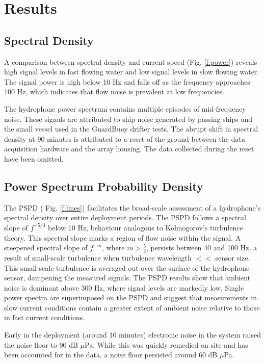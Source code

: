 \documentclass[12pt,journal,onecolumn]{IEEEtran}
\begin{document}
\section{Results}
\label{IV}



\subsection{Spectral Density}

A comparison between spectral density and current speed (Fig. \ref{f:power}) reveals high signal levels in fast flowing water and low signal levels in slow flowing water. The signal power is high below 10 Hz and falls off as the frequency approaches 100 Hz, which indicates that flow noise is prevalent at low frequencies. 

The hydrophone power spectrum contains multiple episodes of mid-frequency noise. These signals are attributed to ship noise generated by passing ships and the small vessel used in the GuardBuoy drifter tests. The abrupt shift in spectral density at 90 minutes is attributed to a reset of the ground between the data acquisition hardware and the array housing. The data collected during the reset have been omitted.
\subsection{Power Spectrum Probability Density}
The PSPD ( Fig. \ref{f:lines}) facilitates the broad-scale assessment of a hydrophone's spectral density over entire deployment periods. The PSPD follows a spectral slope of $f^{-5/3}$ below 10 Hz, behaviour analogous to Kolmogorov's turbulence theory. This spectral slope marks a region of flow noise within the signal. A steepened spectral slope of $f^{-m}$, where $m>\frac{5}{3}$, persists between 40 and 100 Hz, a result of small-scale turbulence when turbulence wavelength $<<$ sensor size. This small-scale turbulence is averaged out over the surface of the hydrophone sensor, dampening the measured signals. The PSPD results show that ambient noise is dominant above 300 Hz, where signal levels are markedly low. Single power spectra are superimposed on the PSPD and suggest that measurements in slow current conditions contain a greater extent of ambient noise relative to those in fast current conditions. 

Early in the deployment (around 10 minutes) electronic noise in the system raised the noise floor to 90 dB $\mu$Pa. While this was quickly remedied on site and has been accounted for in the data, a noise floor persisted around 60 dB $\mu$Pa. 
\end{document}
